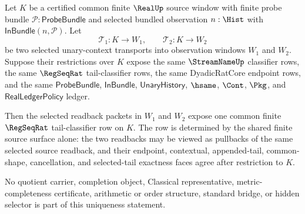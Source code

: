 \begin{theorem}
\label{thm:real-selected-transport-readback-pullback-uniqueness}
Let $K$ be a certified common finite $\RealUp$ source window with finite
probe bundle $\mathcal{P}:\mathsf{ProbeBundle}$ and selected bundled
observation $n:\Hist$ with $\mathsf{InBundle}(n,\mathcal{P})$. Let
$$
\mathcal{T}_1:K\to W_1,\qquad
\mathcal{T}_2:K\to W_2
$$
be two selected unary-context transports into observation windows $W_1$ and
$W_2$. Suppose their restrictions over $K$ expose the same
$\StreamNameUp$ classifier rows, the same $\RegSeqRat$ tail-classifier rows,
the same DyadicRatCore endpoint rows, and the same
$\mathsf{ProbeBundle}$, $\mathsf{InBundle}$, $\mathsf{UnaryHistory}$,
$\hsame$, $\Cont$, $\Pkg$, and $\mathsf{RealLedgerPolicy}$ ledger.

Then the selected readback packets in $W_1$ and $W_2$ expose one common finite
$\RegSeqRat$ tail-classifier row on $K$. The row is determined by the shared
finite source surface alone: the two readbacks may be viewed as pullbacks of
the same selected source readback, and their endpoint, contextual,
appended-tail, common-shape, cancellation, and selected-tail exactness faces
agree after restriction to $K$.

No quotient carrier, completion object, Classical representative,
metric-completeness certificate, arithmetic or order structure, standard
bridge, or hidden selector is part of this uniqueness statement.
\end{theorem}
